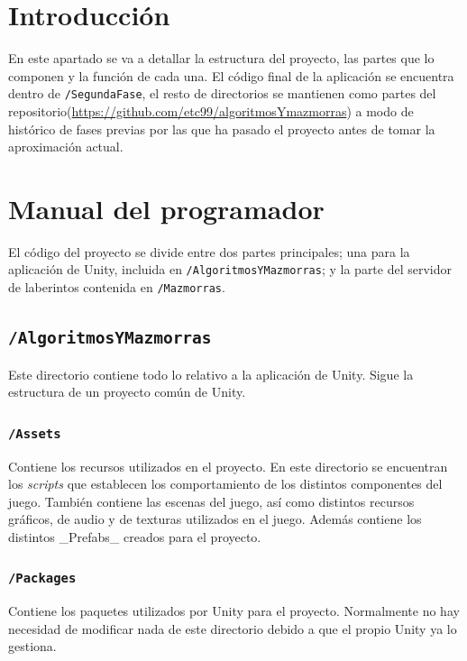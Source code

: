 
\section{Introducción}

En este apartado se va a detallar la estructura del proyecto, las partes que lo componen y la función de cada una. El código final de la aplicación se encuentra dentro de \texttt{/SegundaFase}, el resto de directorios se mantienen como partes del repositorio(\url{https://github.com/etc99/algoritmosYmazmorras}) a modo de histórico de fases previas por las que ha pasado el proyecto antes de tomar la aproximación actual.

\section{Manual del programador}

El código del proyecto se divide entre dos partes principales; una para la aplicación de Unity, incluida en \texttt{/AlgoritmosYMazmorras}; y la parte del servidor de laberintos contenida en \texttt{/Mazmorras}.

\subsection{\texttt{/AlgoritmosYMazmorras}}
Este directorio contiene todo lo relativo a la aplicación de Unity. Sigue la estructura de un proyecto común de Unity.

\subsubsection{\texttt{/Assets}}
Contiene los recursos utilizados en el proyecto. En este directorio se encuentran los \textit{scripts} que establecen los comportamiento de los distintos componentes del juego. También contiene las escenas del juego, así como distintos recursos gráficos, de audio y de texturas utilizados en el juego. Además contiene los distintos \_Prefabs\_ creados para el proyecto.

\subsubsection{\texttt{/Packages}}
Contiene los paquetes utilizados por Unity para el proyecto. Normalmente no hay necesidad de modificar nada de este directorio debido a que el propio Unity ya lo gestiona.

